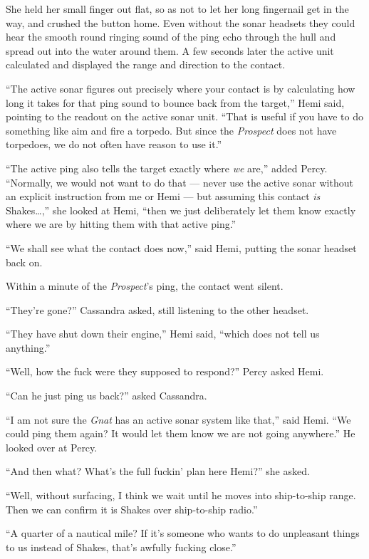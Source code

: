 \documentclass[
]{scrbook}
\begin{document}
She held her small finger out flat, so as not to let her long fingernail
get in the way, and crushed the button home. Even without the sonar
headsets they could hear the smooth round ringing sound of the ping echo
through the hull and spread out into the water around them. A few
seconds later the active unit calculated and displayed the range and
direction to the contact.

``The active sonar figures out precisely where your contact is by
calculating how long it takes for that ping sound to bounce back from
the target,'' Hemi said, pointing to the readout on the active sonar
unit. ``That is useful if you have to do something like aim and fire a
torpedo. But since the \emph{Prospect} does not have torpedoes, we do
not often have reason to use it.''

``The active ping also tells the target exactly where \emph{we} are,''
added Percy. ``Normally, we would not want to do that --- never use the
active sonar without an explicit instruction from me or Hemi --- but
assuming this contact \emph{is} Shakes\ldots,'' she looked at Hemi,
``then we just deliberately let them know exactly where we are by
hitting them with that active ping.''

``We shall see what the contact does now,'' said Hemi, putting the sonar
headset back on.

Within a minute of the \emph{Prospect}'s ping, the contact went silent.

``They're gone?'' Cassandra asked, still listening to the other headset.

``They have shut down their engine,'' Hemi said, ``which does not tell
us anything.''

``Well, how the fuck were they supposed to respond?'' Percy asked Hemi.

``Can he just ping us back?'' asked Cassandra.

``I am not sure the \emph{Gnat} has an active sonar system like that,''
said Hemi. ``We could ping them again? It would let them know we are not
going anywhere.'' He looked over at Percy.

``And then what? What's the full fuckin' plan here Hemi?'' she asked.

``Well, without surfacing, I think we wait until he moves into
ship-to-ship range. Then we can confirm it is Shakes over ship-to-ship
radio.''

``A quarter of a nautical mile? If it's someone who wants to do
unpleasant things to us instead of Shakes, that's awfully fucking
close.''
\end{document}
